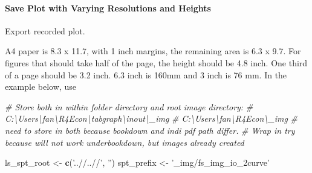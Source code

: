 \documentclass[
]{book}
\newenvironment{Shaded}{\begin{snugshade}}{\end{snugshade}}
\newcommand{\CommentTok}[1]{\textcolor[rgb]{0.56,0.35,0.01}{\textit{#1}}}
\newcommand{\KeywordTok}[1]{\textcolor[rgb]{0.13,0.29,0.53}{\textbf{#1}}}
\newcommand{\NormalTok}[1]{#1}
\newcommand{\StringTok}[1]{\textcolor[rgb]{0.31,0.60,0.02}{#1}}
\begin{document}
\hypertarget{save-plot-with-varying-resolutions-and-heights}{%
\paragraph{Save Plot with Varying Resolutions and Heights}\label{save-plot-with-varying-resolutions-and-heights}}

Export recorded plot.

A4 paper is 8.3 x 11.7, with 1 inch margins, the remaining area is 6.3 x 9.7. For figures that should take half of the page, the height should be 4.8 inch. One third of a page should be 3.2 inch. 6.3 inch is 160mm and 3 inch is 76 mm. In the example below, use

\begin{Shaded}
\begin{Highlighting}[]
\CommentTok{# Store both in within folder directory and root image directory:}
\CommentTok{# C:\textbackslash{}Users\textbackslash{}fan\textbackslash{}R4Econ\textbackslash{}tabgraph\textbackslash{}inout\textbackslash{}_img}
\CommentTok{# C:\textbackslash{}Users\textbackslash{}fan\textbackslash{}R4Econ\textbackslash{}_img}
\CommentTok{# need to store in both because bookdown and indi pdf path differ.}
\CommentTok{# Wrap in try because will not work underbookdown, but images already created}

\NormalTok{ls_spt_root <-}\StringTok{ }\KeywordTok{c}\NormalTok{(}\StringTok{'..//..//'}\NormalTok{, }\StringTok{''}\NormalTok{)}
\NormalTok{spt_prefix <-}\StringTok{ '_img/fs_img_io_2curve'}


\end{Highlighting}
\end{Shaded}
\end{document}
